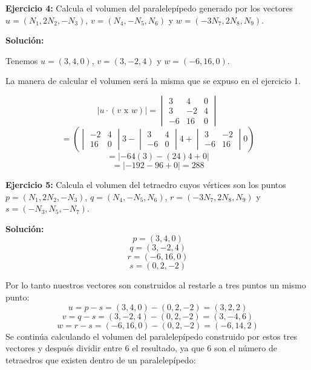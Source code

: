 \documentclass{article}
\begin{document}
\textbf{Ejercicio 4:} Calcula el volumen del paralelepípedo generado por los vectores $u =(N_1, 2N_2,-N_3)$, $v = (N_4, -N_5,N_6)$ y
$w = (-3N_7, 2N_8, N_9)$.
\vspace{10pt}


\textbf{Solución:}
\vspace*{10pt}


Tenemos $u =(3, 4,0)$, $v = (3, -2,4)$ y $w = (-6, 16, 0)$.


La manera de calcular el volumen será la misma que se expuso en el ejercicio 1.


$$\left| u \cdot(v\text{ x }w)\right| = \begin{vmatrix}
   3 & 4 & 0 \\
   3 & -2 & 4 \\
   -6 & 16 & 0
\end{vmatrix}$$
$$ = \left(\begin{vmatrix}
   -2 & 4 \\
   16 & 0
\end{vmatrix}3-\begin{vmatrix}
   3 & 4 \\
   -6 & 0
\end{vmatrix}4+ \begin{vmatrix}
   3 & -2 \\
   -6 & 16
\end{vmatrix}0\right)$$
$$=\left|-64(3)-(24)4+0\right|$$
$$=\left|-192-96+0\right| = 288$$


\textbf{Ejercicio 5:} Calcula el volumen del tetraedro cuyos vértices son los puntos $p = (N_1, 2N_2 , -N_3)$, $q =(N_4,-N_5,N_6)$,
$r = (-3N_7, 2N_8,N_9)$ y $s =(-N_3, N_5,-N_7)$.
\vspace{10pt}


\textbf{Solución:}
$$p =(3, 4, 0)$$
$$q =(3,-2,4)$$
$$r = (-6, 16,0)$$
$$s =(0, 2,-2)$$


Por lo tanto nuestros vectores son construidos al restarle a tres puntos un mismo punto:
$$u = p -s = (3, 4, 0) - (0, 2,-2) = (3, 2, 2)$$
$$v = q - s= (3,-2,4)-(0, 2,-2) = (3, -4, 6)$$
$$w = r - s = (-6, 16, 0) - (0, 2,-2)= (-6, 14, 2)$$
Se continúa calculando el volumen del paralelepípedo construido por estos tres vectores y después dividir entre 6 el resultado, ya que 6 son
el número de tetraedros que existen dentro de un paralelepípedo:
\end{document}

